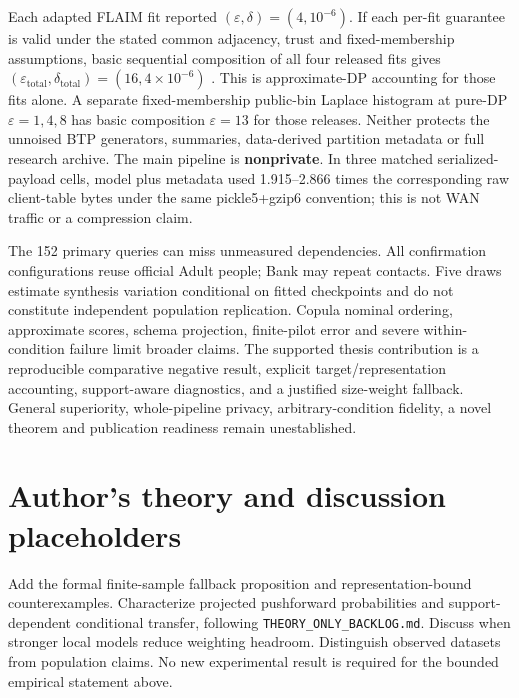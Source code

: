 \documentclass[11pt,a4paper]{article}
\begin{document}
Each adapted FLAIM fit reported $(\varepsilon,\delta)=(4,10^{-6})$. If each per-fit guarantee is valid under the stated common adjacency, trust and fixed-membership assumptions, basic sequential composition of all four released fits gives $(\varepsilon_{\mathrm{total}},\delta_{\mathrm{total}})=(16,4\times10^{-6})$ \cite[Theorem~3.16]{dwork2014foundations}. This is approximate-DP accounting for those fits alone. A separate fixed-membership public-bin Laplace histogram at pure-DP $\varepsilon=1,4,8$ has basic composition $\varepsilon=13$ for those releases. Neither protects the unnoised BTP generators, summaries, data-derived partition metadata or full research archive. The main pipeline is \textbf{nonprivate}. In three matched serialized-payload cells, model plus metadata used 1.915--2.866 times the corresponding raw client-table bytes under the same pickle5+gzip6 convention; this is not WAN traffic or a compression claim.

The 152 primary queries can miss unmeasured dependencies. All confirmation configurations reuse official Adult people; Bank may repeat contacts. Five draws estimate synthesis variation conditional on fitted checkpoints and do not constitute independent population replication. Copula nominal ordering, approximate scores, schema projection, finite-pilot error and severe within-condition failure limit broader claims. The supported thesis contribution is a reproducible comparative negative result, explicit target/representation accounting, support-aware diagnostics, and a justified size-weight fallback. General superiority, whole-pipeline privacy, arbitrary-condition fidelity, a novel theorem and publication readiness remain unestablished.

\section*{Author's theory and discussion placeholders}
Add the formal finite-sample fallback proposition and representation-bound counterexamples. Characterize projected pushforward probabilities and support-dependent conditional transfer, following \texttt{THEORY\_ONLY\_BACKLOG.md}. Discuss when stronger local models reduce weighting headroom. Distinguish observed datasets from population claims. No new experimental result is required for the bounded empirical statement above.

\begingroup\small


\endgroup
\end{document}
